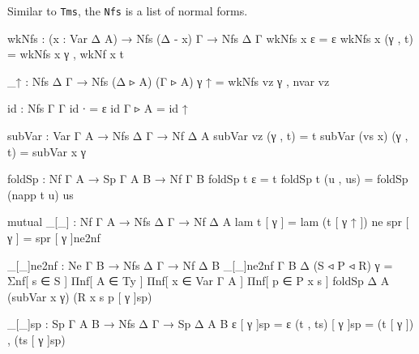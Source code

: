 Similar to \texttt{Tms}, the \texttt{Nfs} is a list of normal forms.

\begin{code}[hide]
wkNfs : (x : Var Δ A) → Nfs (Δ - x) Γ → Nfs Δ Γ
wkNfs x ε = ε
wkNfs x (γ , t) = wkNfs x γ , wkNf x t

_↑ : Nfs Δ Γ → Nfs (Δ ▹ A) (Γ ▹ A)
γ ↑ = wkNfs vz γ , nvar vz

id : Nfs Γ Γ
id {∙} = ε
id {Γ ▹ A} = id ↑

subVar : Var Γ A → Nfs Δ Γ → Nf Δ A
subVar vz (γ , t) = t
subVar (vs x) (γ , t) = subVar x γ

foldSp : Nf Γ A → Sp Γ A B → Nf Γ B
foldSp t ε = t
foldSp t (u , us) = foldSp (napp t u) us
\end{code}

\begin{code}
mutual
  _[_] : Nf Γ A → Nfs Δ Γ → Nf Δ A
  lam t [ γ ] = lam (t [ γ ↑ ])
  ne spr [ γ ] = spr [ γ ]ne2nf

  _[_]ne2nf : Ne Γ B → Nfs Δ Γ → Nf Δ B
  _[_]ne2nf {Γ} {B} {Δ} (S ◃ P ◃ R) γ =
    Σnf[ s ∈ S ] Πnf[ A ∈ Ty ] Πnf[ x ∈ Var Γ A ] Πnf[ p ∈ P x s ]
    foldSp {Δ} {A} (subVar x γ) (R x s p [ γ ]sp)

  _[_]sp : Sp Γ A B → Nfs Δ Γ → Sp Δ A B
  ε [ γ ]sp = ε
  (t , ts) [ γ ]sp = (t [ γ ]) , (ts [ γ ]sp)
\end{code}